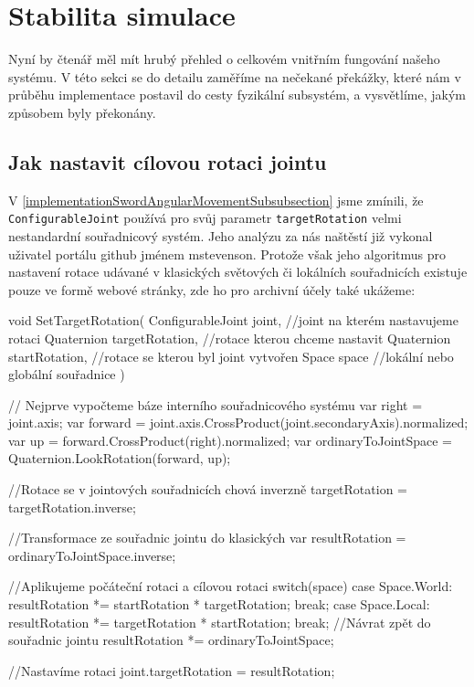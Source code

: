 \section{Stabilita simulace} \label{simulationStabilitySection}

Nyní by čtenář měl mít hrubý přehled o celkovém vnitřním fungování našeho systému. V této sekci se do detailu zaměříme na nečekané překážky, které nám v průběhu implementace postavil do cesty fyzikální subsystém, a vysvětlíme, jakým způsobem byly překonány.

\subsection{Jak nastavit cílovou rotaci jointu} \label{howToSetJointsTargetRotationSection}

V \ref{implementationSwordAngularMovementSubsubsection} jsme zmínili, že \texttt{ConfigurableJoint} používá pro svůj parametr \texttt{targetRotation} velmi nestandardní souřadnicový systém. Jeho analýzu za nás naštěstí již vykonal \cite{ConfigurableJointExtensions} uživatel portálu github jménem mstevenson. Protože však jeho algoritmus pro nastavení rotace udávané v klasických světových či lokálních souřadnicích existuje pouze ve formě webové stránky, zde ho pro archivní účely také ukážeme: 

\begin{code}
void SetTargetRotation(
 ConfigurableJoint joint, //joint na kterém nastavujeme rotaci 
 Quaternion targetRotation, //rotace kterou chceme nastavit
 Quaternion startRotation, //rotace se kterou byl joint vytvořen
 Space space //lokální nebo globální souřadnice
)
{
 // Nejprve vypočteme báze interního souřadnicového systému
 var right = joint.axis;
 var forward = joint.axis.CrossProduct(joint.secondaryAxis).normalized;
 var up = forward.CrossProduct(right).normalized;
 var ordinaryToJointSpace = Quaternion.LookRotation(forward, up);
 
 //Rotace se v jointových souřadnicích chová inverzně
 targetRotation = targetRotation.inverse;

 //Transformace ze souřadnic jointu do klasických
 var resultRotation = ordinaryToJointSpace.inverse;

 //Aplikujeme počáteční rotaci a cílovou rotaci
 switch(space){
  case Space.World:
    resultRotation *= startRotation * targetRotation;
    break;
  case Space.Local:
    resultRotation *= targetRotation * startRotation;
    break;
 }
 //Návrat zpět do souřadnic jointu
 resultRotation *= ordinaryToJointSpace;
 
 //Nastavíme rotaci
 joint.targetRotation = resultRotation;
 }
\end{code}

